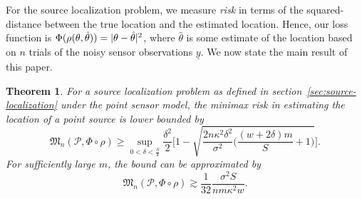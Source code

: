 \documentclass[conference,letterpaper]{IEEEtran}
\providecommand{\v}{}
\renewcommand{\v}[1]{\underline{#1}}
\DeclarePairedDelimiter\abs{\lvert}{\rvert}
\newcommand{\Phiorho}{\Phi\!\circ\!\rho}
\newtheorem{theorem}{Theorem}
\begin{document}
For the source localization problem, we measure \emph{risk} in terms of the
squared-distance between the true location and the estimated location. Hence,
our loss function is $\Phi(\rho(\theta, \hat\theta)) = \abs{\theta -
\hat\theta}^2$, where $\hat\theta$ is some estimate of the location based on
$n$ trials of the noisy sensor observations $\v y$. We now state the main
result of this paper.
\begin{theorem} \label{thm:main-lb}
	For a source localization problem as defined in
	section~\ref{sec:source-localization} under the point sensor model, the
	minimax risk in estimating the location of a point source is lower bounded
	by
	\begin{equation*}
		\mathfrak{M}_n(\mathcal{P}, \Phi\circ\rho) \geq \sup_{0 < \delta < \frac{S}{4}} \frac{\delta^2}{2} \Bigg[1 - \sqrt{\frac{2n \kappa^2 \delta^2}{\sigma^2}\bigg(\!\frac{(w{+}2\delta) m}{S} + 1\!\bigg)} \Bigg].
	\end{equation*}
	For sufficiently large $m$, the bound can be approximated by
	\begin{equation} \label{eq:main-lower-bound}
		\mathfrak{M}_n(\mathcal{P}, \Phiorho) \gtrsim \frac{1}{32} \frac{\sigma^2 S}{nm\kappa^2w}.
	\end{equation}
\end{theorem}%
\end{document}
